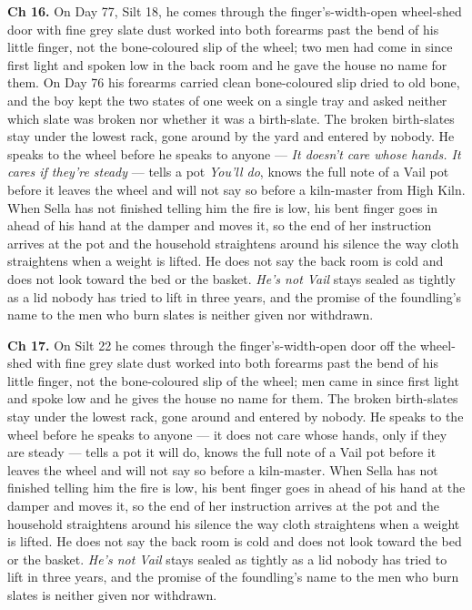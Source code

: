 \documentclass{design/chronicle}
\begin{document}
{\textbf{Ch 16.} On Day 77, Silt 18, he comes through the finger’s-width-open wheel-shed door with fine grey slate dust worked into both forearms past the bend of his little finger, not the bone-coloured slip of the wheel; two men had come in since first light and spoken low in the back room and he gave the house no name for them. On Day 76 his forearms carried clean bone-coloured slip dried to old bone, and the boy kept the two states of one week on a single tray and asked neither which slate was broken nor whether it was a birth-slate. The broken birth-slates stay under the lowest rack, gone around by the yard and entered by nobody. He speaks to the wheel before he speaks to anyone --- \emph{It doesn’t care whose hands. It cares if they’re steady} --- tells a pot \emph{You’ll do}, knows the full note of a Vail pot before it leaves the wheel and will not say so before a kiln-master from High Kiln. When Sella has not finished telling him the fire is low, his bent finger goes in ahead of his hand at the damper and moves it, so the end of her instruction arrives at the pot and the household straightens around his silence the way cloth straightens when a weight is lifted. He does not say the back room is cold and does not look toward the bed or the basket. \emph{He’s not Vail} stays sealed as tightly as a lid nobody has tried to lift in three years, and the promise of the foundling’s name to the men who burn slates is neither given nor withdrawn.

\textbf{Ch 17.} On Silt 22 he comes through the finger’s-width-open door off the wheel-shed with fine grey slate dust worked into both forearms past the bend of his little finger, not the bone-coloured slip of the wheel; men came in since first light and spoke low and he gives the house no name for them. The broken birth-slates stay under the lowest rack, gone around and entered by nobody. He speaks to the wheel before he speaks to anyone — it does not care whose hands, only if they are steady — tells a pot it will do, knows the full note of a Vail pot before it leaves the wheel and will not say so before a kiln-master. When Sella has not finished telling him the fire is low, his bent finger goes in ahead of his hand at the damper and moves it, so the end of her instruction arrives at the pot and the household straightens around his silence the way cloth straightens when a weight is lifted. He does not say the back room is cold and does not look toward the bed or the basket. \emph{He’s not Vail} stays sealed as tightly as a lid nobody has tried to lift in three years, and the promise of the foundling’s name to the men who burn slates is neither given nor withdrawn.

}
\end{document}
